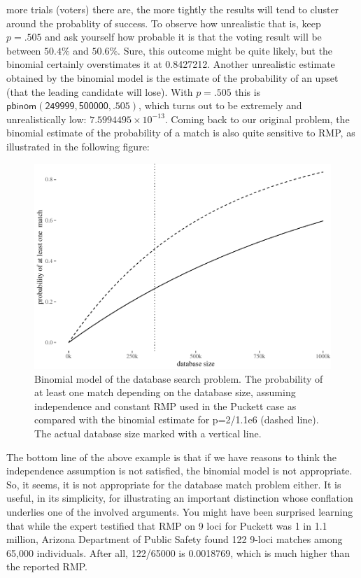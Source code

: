 \documentclass[10pt,dvipsnames,enabledeprecatedfontcommands]{scrartcl}
\begin{document}
more trials (voters) there are, the more tightly the results will tend
to cluster around the probablity of success. To observe how unrealistic
that is, keep \(p=.505\) and ask yourself how probable it is that the
voting result will be between \(50.4\%\) and \(50.6\%\). Sure, this
outcome might be quite likely, but the binomial certainly overstimates
it at 0.8427212. Another unrealistic estimate obtained by the binomial
model is the estimate of the probability of an upset (that the leading
candidate will lose). With \(p=.505\) this is
\(\mathsf{pbinom(249999,500000,.505)}\), which turns out to be extremely
and unrealistically low: \ensuremath{7.5994495\times 10^{-13}}. Coming
back to our original problem, the binomial estimate of the probability
of a match is also quite sensitive to RMP, as illustrated in the
following figure:

\begin{figure}

{\centering \includegraphics[width=0.8\linewidth]{lr-chapter_files/figure-latex/puckett-1} 

}

\caption{Binomial model of the database search problem. The probability of at least one match depending on the database size, assuming independence and constant RMP used in  the Puckett case as compared with the binomial estimate for p=2/1.1e6 (dashed line). The actual database size marked with a vertical line.}\label{fig:puckett}
\end{figure}

The bottom line of the above example is that if we have reasons to think
the independence assumption is not satisfied, the binomial model is not
appropriate. So, it seems, it is not appropriate for the database match
problem either. It is useful, in its simplicity, for illustrating an
important distinction whose conflation underlies one of the involved
arguments. You might have been surprised learning that while the expert
testified that RMP on 9 loci for Puckett was 1 in 1.1 million, Arizona
Department of Public Safety found 122 9-loci matches among 65,000
individuals. After all, 122/65000 is 0.0018769, which is much higher
than the reported RMP.
\end{document}
